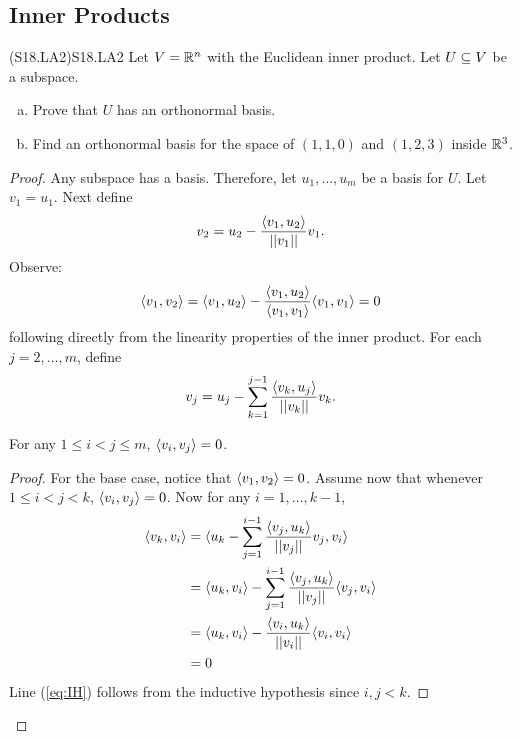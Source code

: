 \documentclass[../AlgebraQualSolutions.tex]{subfiles}
\begin{document}
\subsection{Inner Products}

\begin{prob}{(S18.LA2)}{S18.LA2}
    Let $V = \R^n$ with the Euclidean inner product. Let $U \sq V$ be a subspace.
    \begin{enumerate}[(a)]
        \item Prove that $U$ has an orthonormal basis.
        \item Find an orthonormal basis for the space of $(1,1,0)$ and $(1,2,3)$ inside $\R^3$.
    \end{enumerate}
\end{prob}

\begin{proof}
    Any subspace has a basis. Therefore, let $u_1,\ldots, u_m$ be a basis for $U$. Let $v_1 = u_1$. Next define
        \[v_2 = u_2 - \frac{\ip{v_1}{u_2}}{\norm[v_1]}v_1.\]
    Observe:
        \[\ip{v_1}{v_2} = \ip{v_1}{u_2} - \frac{\ip{v_1}{u_2}}{\ip{v_1}{v_1}}\ip{v_1}{v_1} = 0\]
    following directly from the linearity properties of the inner product. For each $j = 2,\ldots,m$, define
        \[v_j = u_j - \sum_{k=1}^{j-1}\frac{\ip{v_k}{u_j}}{\norm[v_k]}v_k.\]

        \begin{claim}
            For any $1 \leq i < j \leq m$, $\ip{v_i}{v_j} = 0$.

            \begin{proof}
                For the base case, notice that $\ip{v_1}{v_2} = 0$. Assume now that whenever $1 \leq i < j < k$, $\ip{v_i}{v_j} = 0$. Now for any $i = 1, \ldots, k-1$,
                    \begin{align*}
                        \ip{v_k}{v_i} &= \ip{u_k - \sum_{j=1}^{i-1} \frac{\ip{v_j}{u_k}}{\norm[v_j]}v_j}{v_i}\\
                        &= \ip{u_k}{v_i} - \sum_{j=1}^{i-1} \frac{\ip{v_j}{u_k}}{\norm[v_j]}\ip{v_j}{v_i}\\
                        &= \ip{u_k}{v_i} - \frac{\ip{v_i}{u_k}}{\norm[v_i]}\ip{v_i}{v_i} \label{eq:IH}\\
                        &= 0
                    \end{align*}
                Line (\ref{eq:IH}) follows from the inductive hypothesis since $i, j < k$.
            \end{proof}
        \end{claim}


\end{proof}
\end{document}
